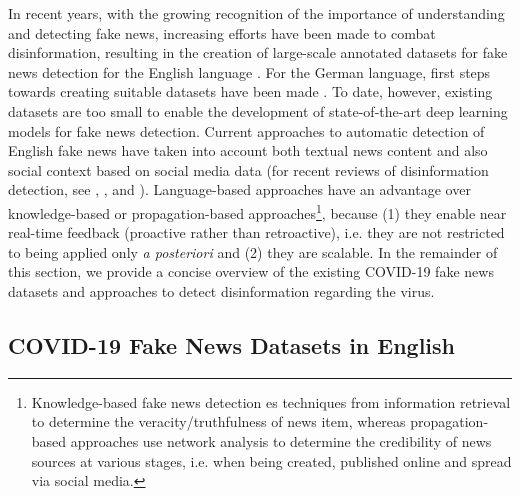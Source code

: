 \documentclass[11pt]{article}
\begin{document}
In recent years, with the growing recognition of the importance of understanding and detecting fake news, increasing
efforts have been made to combat disinformation, resulting in the creation of large-scale annotated datasets for fake news detection for the English language \citep{https://doi.org/10.1002/spy2.9, doi:10.1089/big.2020.0062, wang-2017-liar, thorne-etal-2018-fever}. For the German language, first steps towards creating suitable datasets have been made \citep{TPDL_Vogel19, vogel2020topic}. To date, however, existing datasets are too small to enable the development of state-of-the-art deep learning models for fake news detection. Current approaches to automatic detection of English fake news \citep{10.1007/978-3-030-50423-6_49, 10.1145/3219819.3219903, 10.1145/3132847.3132877,qiao-etal-2020-language} have taken into account both textual news content and also social context based on social media data (for recent reviews of disinformation detection, see \citet{oshikawa-etal-2020-survey}, \citet{https://doi.org/10.1002/widm.1385}, \citet{Zhou2018FakeNA} and \citet{10.1145/3137597.3137600}). Language-based approaches have an advantage over knowledge-based or propagation-based approaches\footnote{Knowledge-based fake news detection es techniques from information retrieval to determine the veracity/truthfulness of news item, whereas propagation-based approaches use network analysis to determine the credibility of news sources at various stages, i.e. when being created, published online and spread via social media.}, because (1) they enable near real-time feedback (proactive rather than retroactive), i.e. they are not restricted to being applied only \textit{a posteriori} \cite{potthast2017stylometric} and (2) they are scalable. In the remainder of this section, we provide a concise overview of the existing COVID-19 fake news datasets and approaches to detect disinformation regarding the virus.

\subsection{COVID-19 Fake News Datasets in English}
\end{document}
